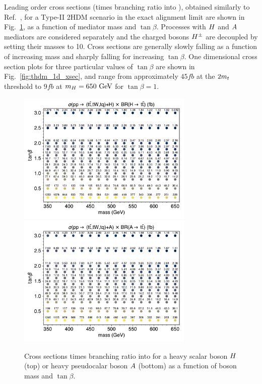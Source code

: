 Leading order cross sections (times branching ratio into \ttbar),
obtained similarly to Ref.~\cite{THEORY:Craig2016ygr},
for a
Type-II 2HDM scenario in the exact alignment limit are shown in
Fig.~\ref{fig:thdm_2d_xsecs}, as a function of mediator mass and $\tan\beta$.
Processes with $H$ and $A$ mediators are considered separately and the
charged bosons $H^\pm$ are decoupled by setting their masses to 10\TeV.
Cross sections are generally slowly falling as a function of increasing mass
and sharply falling for increasing $\tan\beta$. One dimensional cross
section plots for three particular values of $\tan\beta$ are shown in
Fig.~\ref{fig:thdm_1d_xsec}, and range from approximately $45\unit{fb}$ at the
$2m_t$ threshold to $9\unit{fb}$ at $m_H=650~\text{GeV}$ for $\tan\beta=1$.

\begin{figure}[htb!]
    \centering
    \includegraphics[width=0.75\textwidth]{figs/ftan/plot_2d_2hdm_xsec_h} \\
    \includegraphics[width=0.75\textwidth]{figs/ftan/plot_2d_2hdm_xsec_a}
\caption{Cross sections times branching ratio into \ttbar for a heavy scalar boson $H$ (top) 
or heavy pseudocalar boson $A$ (bottom) as a function of boson mass and $\tan\beta$.}
\label{fig:thdm_2d_xsecs}
\end{figure}

